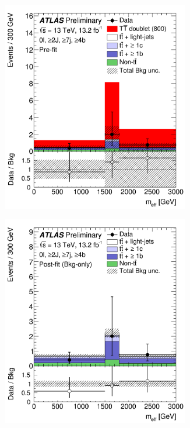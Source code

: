 \begin{figure}[p!]
\begin{subfigure}{0.24\textwidth}
  \caption{}
  \label{}
\end{subfigure}
\begin{subfigure}{0.24\textwidth}
  \centering
  \includegraphics[width=0.9\textwidth]{figures/VLQ/fig_13c.png}
  \caption{}
  \label{}
\end{subfigure}
\begin{subfigure}{0.24\textwidth}
  \centering
  \includegraphics[width=0.9\textwidth]{figures/VLQ/fig_13d.png}

\end{subfigure}
\end{figure}
